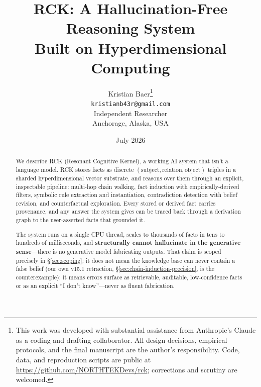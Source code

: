\documentclass[11pt]{article}
\title{RCK: A Hallucination-Free Reasoning System \\
       Built on Hyperdimensional Computing}
\author{Kristian Baer\thanks{This work was developed with substantial
        assistance from Anthropic's Claude as a coding and drafting
        collaborator. All design decisions, empirical protocols, and
        the final manuscript are the author's responsibility. Code,
        data, and reproduction scripts are public at
        \url{https://github.com/NORTHTEKDevs/rck}; corrections and
        scrutiny are welcomed.}\\
        \texttt{kristianb43r@gmail.com}\\
        \small Independent Researcher\\
        \small Anchorage, Alaska, USA}
\date{July 2026}
\begin{document}
\maketitle

\begin{abstract}
We describe RCK (Resonant Cognitive Kernel), a working AI system that
isn't a language model. RCK stores facts as discrete
\((\text{subject}, \text{relation}, \text{object})\) triples in a
sharded hyperdimensional vector substrate, and reasons over them
through an explicit, inspectable pipeline: multi-hop chain walking,
fact induction with empirically-derived filters, symbolic rule
extraction and instantiation, contradiction detection with belief
revision, and counterfactual exploration. Every stored or derived
fact carries provenance, and any answer the system gives can be
traced back through a derivation graph to the user-asserted facts
that grounded it.

The system runs on a single CPU thread, scales to thousands of facts
in tens to hundreds of milliseconds, and \textbf{structurally cannot
hallucinate in the generative sense}---there is no generative model
fabricating outputs. That claim is scoped precisely in
\S\ref{sec:scoping}: it does not mean the knowledge base can never
contain a false belief (our own v15.1 retraction,
\S\ref{sec:chain-induction-precision}, is the counterexample); it
means errors surface as retrievable, auditable, low-confidence facts
or as an explicit ``I don't know''---never as fluent fabrication.


\end{abstract}
\end{document}
